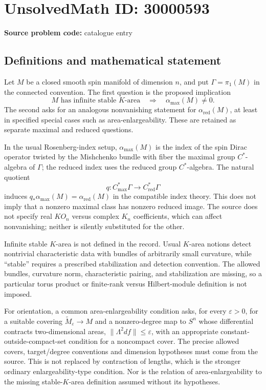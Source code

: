 \documentclass[11pt]{article}
\begin{document}
\section*{UnsolvedMath ID: 30000593}
\textbf{Source problem code:} catalogue entry
\subsection{Definitions and mathematical statement}
Let \(M\) be a closed smooth spin manifold of dimension \(n\), and put \(\Gamma=\pi_1(M)\) in the connected convention. The first question is the proposed implication
\[
 M\text{ has infinite stable }K\text{-area}
 \quad\Longrightarrow\quad\alpha_{\mathrm{max}}(M)\ne0.
\]
The second asks for an analogous nonvanishing statement for \(\alpha_{\mathrm{red}}(M)\), at least in specified special cases such as area-enlargeability. These are retained as separate maximal and reduced questions.

In the usual Rosenberg-index setup, \(\alpha_{\mathrm{max}}(M)\) is the index of the spin Dirac operator twisted by the Mishchenko bundle with fiber the maximal group \(C^*\)-algebra of \(\Gamma\); the reduced index uses the reduced group \(C^*\)-algebra. The natural quotient
\[
 q:C^*_{\mathrm{max}}\Gamma\longrightarrow C^*_{\mathrm{red}}\Gamma
\]
induces \(q_*\alpha_{\mathrm{max}}(M)=\alpha_{\mathrm{red}}(M)\) in the compatible index theory. This does not imply that a nonzero maximal class has nonzero reduced image. The source does not specify real \(KO_n\) versus complex \(K_n\) coefficients, which can affect nonvanishing; neither is silently substituted for the other.

Infinite stable \(K\)-area is not defined in the record. Usual \(K\)-area notions detect nontrivial characteristic data with bundles of arbitrarily small curvature, while ``stable'' requires a prescribed stabilization and detection convention. The allowed bundles, curvature norm, characteristic pairing, and stabilization are missing, so a particular torus product or finite-rank versus Hilbert-module definition is not imposed.

For orientation, a common area-enlargeability condition asks, for every \(\varepsilon>0\), for a suitable covering \(\widetilde M_\varepsilon\to M\) and a nonzero-degree map to \(S^n\) whose differential contracts two-dimensional areas, \(\|\Lambda^2df\|\leq\varepsilon\), with an appropriate constant-outside-compact-set condition for a noncompact cover. The precise allowed covers, target/degree conventions and dimension hypotheses must come from the source. This is not replaced by contraction of lengths, which is the stronger ordinary enlargeability-type condition. Nor is the relation of area-enlargeability to the missing stable-\(K\)-area definition assumed without its hypotheses.
\end{document}
